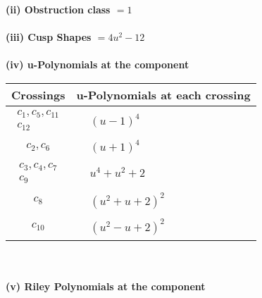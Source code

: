 \documentclass[1p]{elsarticle_modified}
\theoremstyle{definition}
\begin{document}
\flushleft \textbf{(ii) Obstruction class $= 1$}\\~\\
\flushleft \textbf{(iii) Cusp Shapes $= 4 u^2-12$}\\~\\
\newpage\renewcommand{\arraystretch}{1}
\flushleft \textbf{(iv) u-Polynomials at the component}\newline \\
\begin{tabular}{m{50pt}|m{274pt}}
Crossings & \hspace{64pt}u-Polynomials at each crossing \\
\hline $$\begin{aligned}c_{1},c_{5},c_{11}\\c_{12}\end{aligned}$$&$\begin{aligned}
&(u-1)^4
\end{aligned}$\\
\hline $$\begin{aligned}c_{2},c_{6}\end{aligned}$$&$\begin{aligned}
&(u+1)^4
\end{aligned}$\\
\hline $$\begin{aligned}c_{3},c_{4},c_{7}\\c_{9}\end{aligned}$$&$\begin{aligned}
&u^4+u^2+2
\end{aligned}$\\
\hline $$\begin{aligned}c_{8}\end{aligned}$$&$\begin{aligned}
&(u^2+u+2)^2
\end{aligned}$\\
\hline $$\begin{aligned}c_{10}\end{aligned}$$&$\begin{aligned}
&(u^2- u+2)^2
\end{aligned}$\\
\hline
\end{tabular}\\~\\
\newpage\renewcommand{\arraystretch}{1}
\flushleft \textbf{(v) Riley Polynomials at the component}\newline \\
\end{document}
